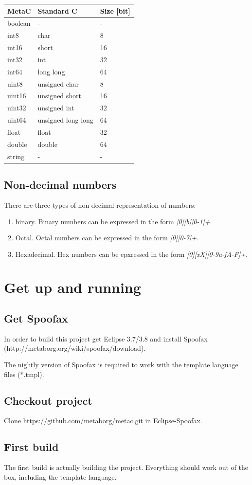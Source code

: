 \documentclass[a4paper,10pt,titlepage]{report}
\begin{document}
\begin{tabular}{|l|l|l|}
\hline
MetaC & Standard C & Size [bit] \\ \hline
boolean & - & -\\ 
int8 & char & 8 \\ 
int16 & short & 16 \\ 
int32 & int & 32 \\ 
int64 & long long & 64 \\ 
uint8 & unsigned char & 8 \\ 
uint16 & unsigned short & 16 \\ 
uint32 & unsigned int & 32 \\ 
uint64 & unsigned long long & 64 \\ 
float & float & 32 \\ 
double & double & 64 \\ 
string & - & - \\
\hline
\end{tabular}


\section{Non-decimal numbers}
There are three types of non decimal representation of numbers:
\begin{enumerate}
\item binary. Binary numbers can be expressed in the form \emph{[0][b][0-1]+}.
\item Octal. Octal numbers can be expressed in the form \emph{[0][0-7]+}.
\item Hexadecimal. Hex numbers can be epxressed in the form \emph{[0][xX][0-9a-fA-F]+}.
\end{enumerate}

\chapter{Get up and running}
\section{Get Spoofax}

In order to build this project get Eclipse 3.7/3.8 and install Spoofax (http://metaborg.org/wiki/spoofax/download).

The nightly version of Spoofax is required to work with the template language files (*.tmpl).

\section{Checkout project}

Clone https://github.com/metaborg/metac.git in Eclipse-Spoofax.

\section{First build}

The first build is actually building the project. Everything should work out of the box, including the template language.
\end{document}
